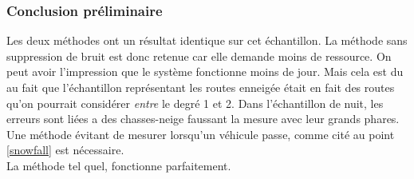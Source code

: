 \subsubsection{Conclusion préliminaire}
Les deux méthodes ont un résultat identique sur cet échantillon. La méthode sans suppression de bruit est donc
retenue car elle demande moins de ressource.
On peut avoir l'impression que le système fonctionne moins de jour. Mais cela est du au fait que l'échantillon
représentant les routes enneigée était en fait des routes qu'on pourrait considérer \emph{entre} le degré 1 et 2.
Dans l'échantillon de nuit, les erreurs sont liées a des chasses-neige faussant la mesure avec leur grands phares.
Une méthode évitant de mesurer lorsqu'un véhicule passe, comme cité au point \ref{snowfall} est nécessaire.\\
La méthode tel quel, fonctionne parfaitement.